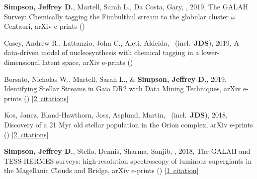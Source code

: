 \item[{\color{numcolor}\scriptsize5}] \textbf{Simpson, Jeffrey D.}, Martell, Sarah L., Da Costa, Gary, \etal, 2019, The GALAH Survey: Chemically tagging the Fimbulthul stream to the globular cluster $\omega$ Centauri, arXiv e-prints ()

\item[{\color{numcolor}\scriptsize4}] Casey, Andrew R., Lattanzio, John C., Aleti, Aldeida, \etal\ (incl.\ \textbf{JDS}), 2019, A data-driven model of nucleosynthesis with chemical tagging in a lower-dimensional latent space, arXiv e-prints ()

\item[{\color{numcolor}\scriptsize3}] Borsato, Nicholas W., Martell, Sarah L., \& \textbf{Simpson, Jeffrey D.}, 2019, Identifying Stellar Streams in Gaia DR2 with Data Mining Techniques, arXiv e-prints () [\href{https://ui.adsabs.harvard.edu/#abs/2019arXiv190702527B}{2~citations}]

\item[{\color{numcolor}\scriptsize2}] Kos, Janez, Bland-Hawthorn, Joss, Asplund, Martin, \etal\ (incl.\ \textbf{JDS}), 2018, Discovery of a 21 Myr old stellar population in the Orion complex, arXiv e-prints () [\href{https://ui.adsabs.harvard.edu/#abs/2018arXiv181111762K}{2~citations}]

\item[{\color{numcolor}\scriptsize1}] \textbf{Simpson, Jeffrey D.}, Stello, Dennis, Sharma, Sanjib, \etal, 2018, The GALAH and TESS-HERMES surveys: high-resolution spectroscopy of luminous supergiants in the Magellanic Clouds and Bridge, arXiv e-prints () [\href{https://ui.adsabs.harvard.edu/#abs/2018arXiv180405900S}{1~citation}]